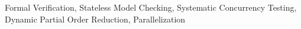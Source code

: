 Formal Verification, Stateless Model Checking, Systematic Concurrency Testing, Dynamic Partial Order Reduction, Parallelization